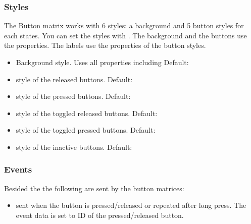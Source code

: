 \documentclass[letterpaper,10pt,english]{sphinxmanual}
\begin{document}
\subsubsection{Styles}
\label{\detokenize{object-types/btnm:styles}}
The Button matrix works with 6 styles: a background and 5 button styles for each states. You can set the styles with .
The background and the buttons use the  properties. The labels use the  properties of the button styles.
\begin{itemize}
\item {} 
 Background style. Uses all  properties including  Default: 

\item {} 
 style of the released  buttons. Default: 

\item {} 
 style of the pressed buttons. Default: 

\item {} 
 style of the toggled released  buttons. Default: 

\item {} 
 style of the toggled pressed  buttons. Default: 

\item {} 
 style of the inactive  buttons. Default: 

\end{itemize}


\subsubsection{Events}
\label{\detokenize{object-types/btnm:events}}
Besided the  the following  are sent by the button matrices:
\begin{itemize}
\item {} 
 sent when the button is pressed/released or repeated after long press. The event data is set to ID of the pressed/released button.

\end{itemize}
\end{document}
